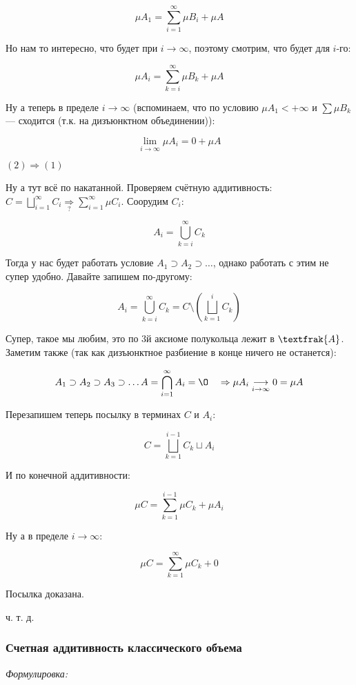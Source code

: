 \documentclass{article}
\begin{document}
\[\mu A_1 = \sum_{i = 1}^{\infty} \mu B_i + \mu A\]

Но нам то интересно, что будет при $i \rightarrow \infty$, поэтому смотрим, что будет для $i$-го: 

\[\mu A_i = \sum_{k = i}^{\infty} \mu B_k + \mu A\]

Ну а теперь в пределе $i \rightarrow \infty$ (вспоминаем, что по условию $\mu A_1 < + \infty$ и $\sum \mu B_k$ --- сходится (т.к. на дизъюнктном объединении)):

\[\lim_{i \rightarrow \infty} \mu A_i = 0 + \mu A\]

\textbf{$(2) \Rightarrow (1)$}

Ну а тут всё по накатанной. Проверяем счётную аддитивность: $C = \bigsqcup_{i = 1}^{\infty} C_i \underset{?}{\Rightarrow} \sum_{i = 1}^{\infty} \mu C_i$. Соорудим $C_i$:

\[A_i = \bigcup_{k = i}^{\infty} C_k\]

Тогда у нас будет работать условие $A_1 \supset A_2 \supset \ldots$, однако работать с этим не супер удобно. Давайте запишем по-другому: 

\[A_i = \bigcup_{k = i}^{\infty} C_k = C \setminus \left(\bigsqcup_{k = 1}^{i} C_k\right)\]

Супер, такое мы любим, это по 3й аксиоме полукольца лежит в $\textfrak{A}$. Заметим также (так как дизъюнктное разбиение в конце ничего не останется): 

\[A_1 \supset A_2 \supset A_3 \supset \ldots A = \bigcap_{i = 1}^{\infty} A_i = \O \quad \Rightarrow \mu A_i \underset{i \rightarrow \infty}{\longrightarrow} 0 = \mu A\]

Перезапишем теперь посылку в терминах $C$ и $A_i$:

\[C = \bigsqcup_{k = 1}^{i - 1} C_k \sqcup A_i\]

И по конечной аддитивности:

\[\mu C = \sum_{k = 1}^{i - 1} \mu C_k + \mu A_i\]

Ну а в пределе $i \rightarrow \infty$:

\[\mu C = \sum_{k = 1}^{\infty} \mu C_k + 0\]

Посылка доказана. 

ч. т. д. 


\subsubsection{Счетная аддитивность классического объема}
\textit{Формулировка:}
\end{document}

